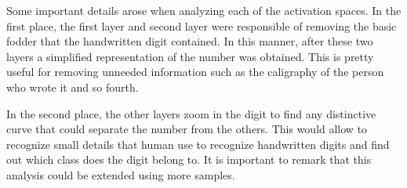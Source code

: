 \documentclass[conference]{IEEEtran}
\theoremstyle{definition}
\theoremstyle{remark}
\theoremstyle{remark}
\begin{document}
Some important details arose when analyzing each of the activation spaces. In
the first place, the first layer and second layer were responsible of removing
the basic fodder that the handwritten digit contained. In this manner, after
these two layers a simplified representation of the number was obtained. This is
pretty useful for removing unneeded information such as the caligraphy of the
person who wrote it and so fourth.

In the second place, the other layers zoom in the digit to find any distinctive
curve that could separate the number from the others. This would allow to
recognize small details that human use to recognize handwritten digits and find
out which class does the digit belong to. It is important to remark that this
analysis could be extended using more samples.
\end{document}
